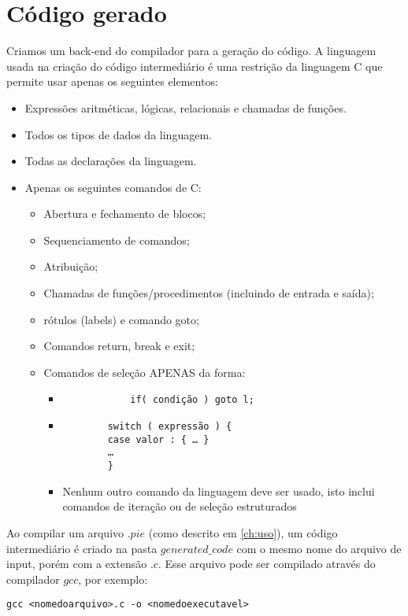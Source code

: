 \section{Código gerado}
Criamos um back-end do compilador para a geração do código. 
A linguagem usada na criação do código intermediário é uma restrição da linguagem C que permite usar apenas os seguintes elementos:
\begin{itemize}
	\item Expressões aritméticas, lógicas, relacionais e chamadas de funções.
	\item Todos os tipos de dados da linguagem.
	\item Todas as declarações da linguagem.
	\item Apenas os seguintes comandos de C:
	\begin{itemize}
		\item Abertura e fechamento de blocos;
		\item Sequenciamento de comandos;
		\item Atribuição;
		\item Chamadas de funções/procedimentos (incluindo de entrada e saída);
		\item rótulos (labels) e comando goto;
		\item Comandos return, break e exit;
		\item Comandos de seleção APENAS da forma:
		\begin{itemize}
			\item \begin{verbatim}
			if( condição ) goto l;
			\end{verbatim}
			\item \begin{verbatim}
		switch ( expressão ) {
		case valor : { … }
		…
		}
		\end{verbatim}
		\item Nenhum outro comando da linguagem deve ser usado, isto inclui comandos de iteração ou de
		seleção estruturados	
		\end{itemize}
	\end{itemize}
\end{itemize}

Ao compilar um arquivo $.pie$ (como descrito em \ref{ch:uso}), um código intermediário é criado na pasta $generated\_code$ com o mesmo nome do arquivo de input, porém com a extensão $.c$. Esse arquivo pode ser compilado através do compilador $gcc$, por exemplo:
\begin{verbatim}
gcc <nomedoarquivo>.c -o <nomedoexecutavel>
\end{verbatim}

